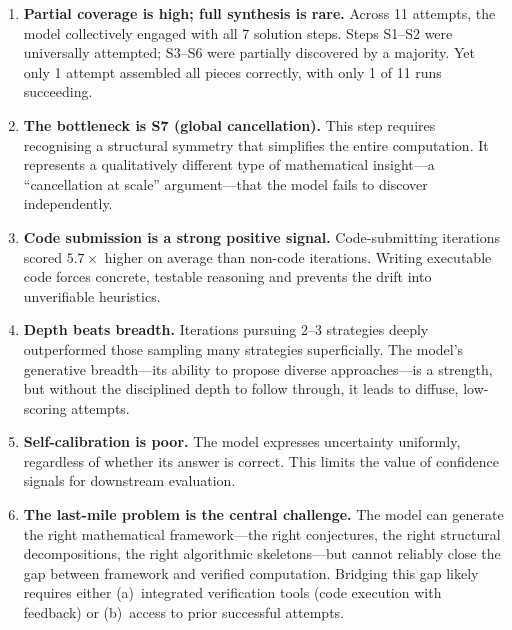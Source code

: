 \documentclass[11pt,a4paper]{article}
\begin{document}
\begin{enumerate}
  \item \textbf{Partial coverage is high; full synthesis is rare.}
    Across 11 attempts, the model collectively engaged with all 7
    solution steps. Steps S1--S2 were universally attempted; S3--S6
    were partially discovered by a majority. Yet only 1 attempt
    assembled all pieces correctly, with only 1 of 11 runs
    succeeding.

  \item \textbf{The bottleneck is S7 (global cancellation).}
    This step requires recognising a structural symmetry that
    simplifies the entire computation. It represents a qualitatively
    different type of mathematical insight---a ``cancellation at
    scale'' argument---that the model fails to discover independently.

  \item \textbf{Code submission is a strong positive signal.}
    Code-submitting iterations scored $5.7\times$ higher on average
    than non-code iterations. Writing executable code forces concrete,
    testable reasoning and prevents the drift into unverifiable
    heuristics.

  \item \textbf{Depth beats breadth.}
    Iterations pursuing 2--3 strategies deeply outperformed those
    sampling many strategies superficially. The model's generative
    breadth---its ability to propose diverse approaches---is a
    strength, but without the disciplined depth to follow through,
    it leads to diffuse, low-scoring attempts.

  \item \textbf{Self-calibration is poor.}
    The model expresses uncertainty uniformly, regardless of whether
    its answer is correct. This limits the value of confidence
    signals for downstream evaluation.

  \item \textbf{The last-mile problem is the central challenge.}
    The model can generate the right mathematical framework---the
    right conjectures, the right structural decompositions, the
    right algorithmic skeletons---but cannot reliably close the
    gap between framework and verified computation. Bridging this
    gap likely requires either (a)~integrated verification tools
    (code execution with feedback) or (b)~access to prior
    successful attempts.
\end{enumerate}
\end{document}
